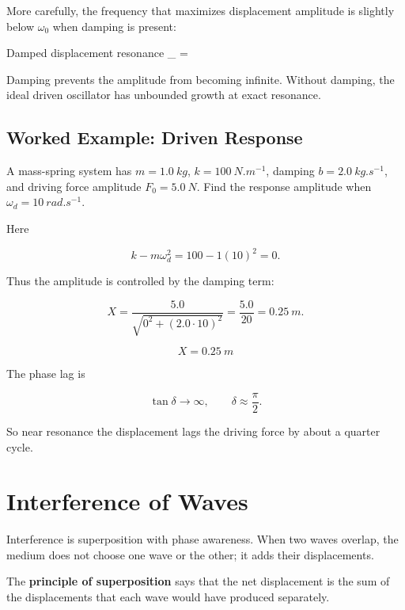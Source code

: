 \documentclass{studentnotes}
\begin{document}
More carefully, the frequency that maximizes displacement amplitude is slightly
below \(\omega_0\) when damping is present:

\begin{namedformula}{Damped displacement resonance}
    \omega_{}
    =
\end{namedformula}

\begin{importantnote}
    Damping prevents the amplitude from becoming infinite. Without damping, the
    ideal driven oscillator has unbounded growth at exact resonance.
\end{importantnote}

\subsection{Worked Example: Driven Response}

A mass-spring system has \(m=\SI{1.0}{kg}\), \(k=\SI{100}{N.m^{-1}}\), damping
\(b=\SI{2.0}{kg.s^{-1}}\), and driving force amplitude \(F_0=\SI{5.0}{N}\). Find
the response amplitude when \(\omega_d=\SI{10}{rad.s^{-1}}\).

Here

\[
    k-m\omega_d^2=100-1(10)^2=0.
\]

Thus the amplitude is controlled by the damping term:

\[
    X=\frac{5.0}{\sqrt{0^2+(2.0\cdot10)^2}}
      =\frac{5.0}{20}
      =\SI{0.25}{m}.
\]

\[
    \boxed{X=\SI{0.25}{m}}
\]

The phase lag is

\[
    \tan\delta\to\infty,
    \qquad
    \delta\approx\frac{\pi}{2}.
\]

So near resonance the displacement lags the driving force by about a quarter
cycle.

\section{Interference of Waves}

Interference is superposition with phase awareness. When two waves overlap, the
medium does not choose one wave or the other; it adds their displacements.

\begin{definition}
    The \textbf{principle of superposition} says that the net displacement is the
    sum of the displacements that each wave would have produced separately.
\end{definition}
\end{document}
